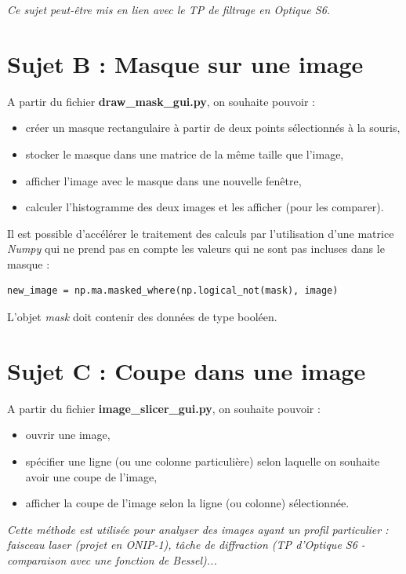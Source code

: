 \documentclass[a4paper,11pt,titlepage]{article} %
\begin{document}
\textit{Ce sujet peut-être mis en lien avec le TP de filtrage en Optique S6.}


\section{Sujet B : Masque sur une image}

A partir du fichier \textbf{draw\_mask\_gui.py}, on souhaite pouvoir :
\begin{itemize}
	\item créer un masque rectangulaire à partir de deux points sélectionnés à la souris,
	\item stocker le masque dans une matrice de la même taille que l'image,
	\item afficher l'image avec le masque dans une nouvelle fenêtre,
	\item calculer l'histogramme des deux images et les afficher (pour les comparer).
\end{itemize}

\medskip

Il est possible d'accélérer le traitement des calculs par l'utilisation d'une matrice \textit{Numpy} qui ne prend pas en compte les valeurs qui ne sont pas incluses dans le masque : 

\begin{lstlisting}
new_image = np.ma.masked_where(np.logical_not(mask), image)
\end{lstlisting}

L'objet \textsl{mask} doit contenir des données de type booléen.



\section{Sujet C : Coupe dans une image}

A partir du fichier \textbf{image\_slicer\_gui.py}, on souhaite pouvoir :

\begin{itemize}
	\item ouvrir une image,
	\item spécifier une ligne (ou une colonne particulière) selon laquelle on souhaite avoir une coupe de l'image,
	\item afficher la coupe de l'image selon la ligne (ou colonne) sélectionnée.
\end{itemize}

\textit{Cette méthode est utilisée pour analyser des images ayant un profil particulier : faisceau laser (projet en ONIP-1), tâche de diffraction (TP d'Optique S6 - comparaison avec une fonction de Bessel)...}
\end{document}
